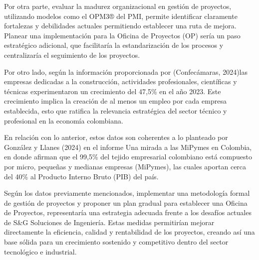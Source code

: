 Por otra parte, evaluar la madurez organizacional en gestión de proyectos, utilizando modelos como el OPM3® del PMI, permite identificar claramente fortalezas y debilidades actuales permitiendo establecer una ruta de mejora. Planear una implementación para la Oficina de Proyectos (OP) sería un paso estratégico adicional, que facilitaría la estandarización de los procesos y centralizaría el seguimiento de los proyectos.

Por otro lado, según la información proporcionada por (Confecámaras, 2024)las empresas dedicadas a la construcción, actividades profesionales, científicas y técnicas experimentaron un crecimiento del 47,5\% en el año 2023. Este crecimiento implica la creación de al menos un empleo por cada empresa establecida, esto que ratifica la relevancia estratégica del sector técnico y profesional en la economía colombiana.

En relación con lo anterior, estos datos son coherentes a lo planteado por González y Llanes (2024) en el informe Una mirada a las MiPymes en Colombia, en donde afirman que el 99,5\% del tejido empresarial colombiano está compuesto por micro, pequeñas y medianas empresas (MiPymes), las cuales aportan cerca del 40\% al Producto Interno Bruto (PIB) del país.

Según los datos previamente mencionados, implementar una metodología formal de gestión de proyectos y proponer un plan gradual para establecer una Oficina de Proyectos, representaría una estrategia adecuada frente a los desafíos actuales de S\&G Soluciones de Ingeniería. Estas medidas permitirían mejorar directamente la eficiencia, calidad y rentabilidad de los proyectos, creando así una base sólida para un crecimiento sostenido y competitivo dentro del sector tecnológico e industrial. 
